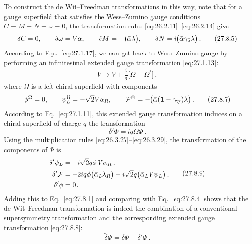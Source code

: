 To construct the de Wit--Freedman transformations in this way, note that for
a gauge superfield that satisfies the Wess--Zumino gauge conditions
\(C=M=N=\omega=0\), the transformation rules
\eqref{eq:26.2.11}--\eqref{eq:26.2.14} give
\begin{equation}
  \delta C=0,\qquad
  \delta\omega=\sl{V}\alpha,\qquad
  \delta M=-\bigl(\bar\alpha\lambda\bigr),\qquad
  \delta N=i\bigl(\bar\alpha\gamma_5\lambda\bigr)\,.
  \tag{27.8.5}\label{eq:27.8.5}
\end{equation}
According to Eqs.~\eqref{eq:27.1.17}, we can get back to Wess--Zumino gauge
by performing an infinitesimal extended gauge transformation
\eqref{eq:27.1.13}:
\begin{equation}
  V\longrightarrow V+\frac{i}{2}\bigl[\Omega-\Omega^*\bigr]\,,
  \tag{27.8.6}\label{eq:27.8.6}
\end{equation}
where \(\Omega\) is a left-chiral superfield with components
\begin{equation}
  \phi^\Omega=0,\qquad
  \psi_L^\Omega=-\sqrt{2}\sl{V}\alpha_R,\qquad
  \mathcal{F}^\Omega
  =-\bigl(\bar\alpha(\mathbf{1}-\gamma_5)\lambda\bigr)\,.
  \tag{27.8.7}\label{eq:27.8.7}
\end{equation}
According to Eq.~\eqref{eq:27.1.11}, this extended gauge transformation
induces on a chiral superfield of charge \(q\) the transformation
\begin{equation}
  \delta'\Phi=iq\Omega\Phi\,.
  \tag{27.8.8}\label{eq:27.8.8}
\end{equation}
Using the multiplication rules
\eqref{eq:26.3.27}--\eqref{eq:26.3.29}, the transformation of the components
of \(\Phi\) is
\begin{equation}
  \begin{aligned}
    \delta'\psi_L
    &=-i\sqrt{2}q\phi\,\sl{V}\alpha_R\,,\\
    \delta'\mathcal{F}
    &=-2iq\phi\bigl(\bar\alpha_L\lambda_R\bigr)
      -i\sqrt{2}q\bigl(\bar\alpha_L\sl{V}\psi_L\bigr)\,,\\
    \delta'\phi&=0\,.
  \end{aligned}
  \tag{27.8.9}\label{eq:27.8.9}
\end{equation}
Adding this to Eq.~\eqref{eq:27.8.1} and comparing with
Eq.~\eqref{eq:27.8.4} shows that the de Wit--Freedman transformation is
indeed the combination of a conventional supersymmetry transformation and
the corresponding extended gauge transformation \eqref{eq:27.8.8}:
\begin{equation}
  \widetilde{\delta}\Phi=\delta\Phi+\delta'\Phi\,.
  \tag{27.8.10}\label{eq:27.8.10}
\end{equation}
